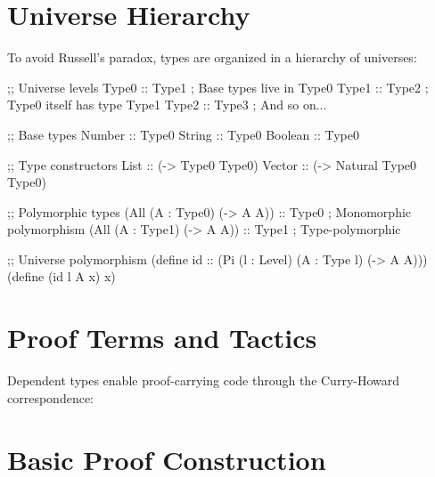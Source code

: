 \section{Universe Hierarchy}
\label{sec:universes}


To avoid Russell's paradox, types are organized in a hierarchy of universes:

\begin{example}
\begin{lambdustcode}
;; Universe levels
Type0 :: Type1      ; Base types live in Type0
Type1 :: Type2      ; Type0 itself has type Type1  
Type2 :: Type3      ; And so on...

;; Base types
Number :: Type0
String :: Type0  
Boolean :: Type0

;; Type constructors
List :: (-> Type0 Type0)
Vector :: (-> Natural Type0 Type0)

;; Polymorphic types
(All (A : Type0) (-> A A)) :: Type0     ; Monomorphic polymorphism
(All (A : Type1) (-> A A)) :: Type1     ; Type-polymorphic

;; Universe polymorphism
(define id :: (Pi (l : Level) (A : Type l) (-> A A)))
(define (id l A x) x)
\end{lambdustcode}
\end{example}

\section{Proof Terms and Tactics}
\label{sec:proof-terms}


Dependent types enable proof-carrying code through the Curry-Howard correspondence:

\section{Basic Proof Construction}
\label{sec:basic-proofs}

